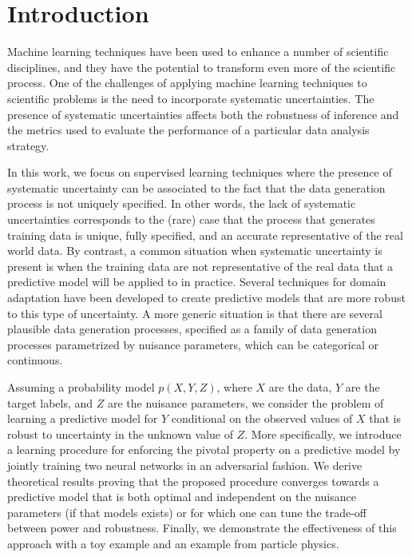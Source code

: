 \documentclass[twocolumn,superscriptaddress,aps]{revtex4-1}
\newcommand{\kcnote}[1]{\textcolor{red}{[KC: #1]}}
\theoremstyle{plain}
\begin{document}
\maketitle

\section{Introduction}



Machine learning techniques have been used to enhance a number of scientific
disciplines, and they have the potential to transform even more of the
scientific process. One of the challenges of applying machine learning
techniques to scientific problems is the need to incorporate systematic
uncertainties. The presence of systematic uncertainties affects both the
robustness of inference and the metrics used to evaluate the performance of a
particular data analysis strategy.

In this work, we focus on supervised learning techniques where the presence of
systematic uncertainty can be associated to the fact that the data generation
process is not uniquely specified. In other words, the lack of systematic
uncertainties corresponds to the (rare) case that the process that generates
training data is unique, fully specified, and an accurate representative of the
real world data.
By contrast, a common situation when systematic uncertainty is present is when the training
data are not representative of the real data that a predictive model will be
applied to in practice. Several techniques for domain adaptation have been
developed to create predictive models that are more robust to this type of
uncertainty.
A more generic situation is that there are several plausible data generation
processes, specified as a family of data generation processes
parametrized by nuisance parameters, which can be categorical or continuous.

Assuming a probability model $p(X,Y,Z)$, where $X$ are the data, $Y$ are the
target labels, and $Z$ are the nuisance parameters, we consider the problem of
learning a predictive model for $Y$ conditional on the observed values of $X$
that is robust to uncertainty in the unknown value of $Z$. More specifically, we
introduce a learning procedure for enforcing the pivotal property on a
predictive model by jointly training two neural networks in an adversarial
fashion. We derive theoretical results proving that the proposed procedure
converges towards a predictive model that is both optimal and independent on the
nuisance parameters (if that models exists) or for which one can tune the
trade-off between power and robustness. Finally, we demonstrate the
effectiveness of this approach with a toy example and an example from particle physics.
\end{document}
